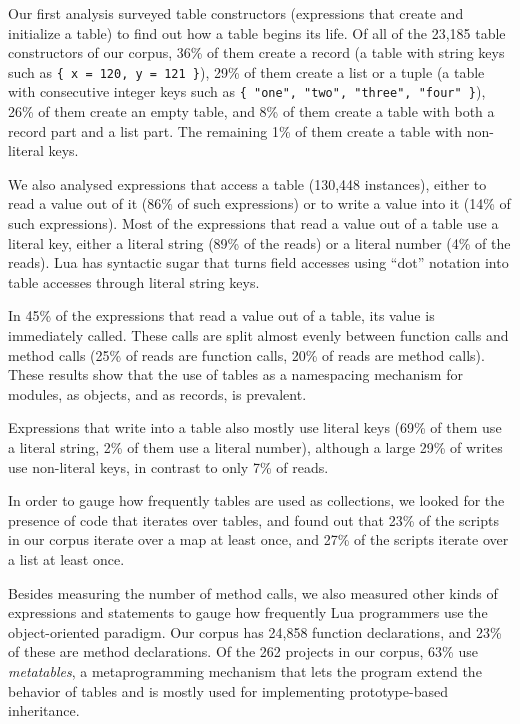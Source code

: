 \documentclass{sigplanconf}
\begin{document}
Our first analysis surveyed table constructors (expressions
that create and initialize a table) to find out how a table
begins its life. Of all of the 23,185 table constructors of
our corpus, 36\% of them create a record (a table with string
keys such as \texttt{\{ x = 120, y = 121 \}}), 29\% of them create
a list or a tuple (a table with consecutive integer keys such as \texttt{\{ "one", "two", "three", "four" \}}), 26\% of them create an empty table, and 8\% of them create a table with
both a record part and a list part. The remaining 1\% of them create a table with non-literal keys.

We also analysed expressions that access a table (130,448 instances), either to read a value out of it (86\% of such expressions) or to write a 
value into it (14\% of such expressions). Most of the expressions
that read a value out of a table use a literal key,
either a literal string (89\% of the reads) or a literal
number (4\% of the reads). Lua has syntactic sugar that
turns field accesses using ``dot'' notation into table
accesses through literal string keys.

In 45\% of the expressions that read a value out of a table,
its value is immediately called. These calls are split almost
evenly between function calls and method calls (25\% of reads
are function calls, 20\% of reads are method calls).
These results show that the use of tables as a namespacing
mechanism for modules, as objects, and as records, 
is prevalent.

Expressions that write into a table also mostly use
literal keys (69\% of them use a literal string, 2\%
of them use a literal number), although a large 29\%
of writes use non-literal keys, in contrast to only 7\% of
reads.

In order to gauge how frequently tables are used as
collections, we looked for the presence of code that
iterates over tables, and found out that 23\% of the
scripts in our corpus iterate over a map at least once,
and 27\% of the scripts iterate over a list at least once.

Besides measuring the number of method calls, we also
measured other kinds of expressions and statements to gauge
how frequently Lua programmers use the object-oriented paradigm.
Our corpus has 24,858 function declarations, and 23\% of these
are method declarations. Of the 262 projects in our corpus,
63\% use {\em metatables}, a metaprogramming mechanism that
lets the program extend the behavior of tables and is mostly
used for implementing prototype-based inheritance.
\end{document}
